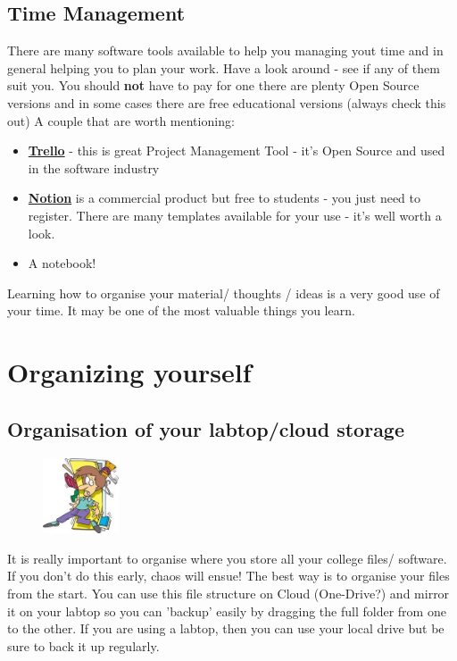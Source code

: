 \documentclass{article}
\begin{document}
 \subsection{Time Management}
 There are many software tools available to help you managing yout time and in general helping you to plan your work. Have a look around - see if any of them suit you. You should \textbf{not} have to pay for one there are plenty Open Source versions and in some cases there are free educational versions (always check this out)
 A couple that are worth mentioning: 
 \begin{itemize}
     \item \href{https://trello.com/en}{\textbf{Trello}} - this is  great Project Management Tool - it's Open Source and used in the software industry
     \item \href{https://www.notion.so/}{\textbf{Notion}} is a commercial product but free to students - you just need to register. There are many templates available for your use - it's well worth a look. 
     \item A notebook! 
 \end{itemize}
 Learning how to organise your material/ thoughts / ideas is a very good use of your time. It may be one of the most valuable things you learn. 
 
 \section{Organizing yourself}
 \subsection{Organisation of your labtop/cloud storage}

\begin{figure} %
    \centering
    \includegraphics[width=0.2\textwidth]{img/chaos.jpg}
\end{figure}

It is really important to organise where you store all your college files/ software.
If you don’t do this early, chaos will ensue! The best way is to organise your files from the start. 
You can use this file structure on Cloud (One-Drive?) and mirror it on your labtop so you can 'backup' easily by dragging the full folder from one to the other. 
If you are using a labtop, then you can use your local drive but be sure to back it up regularly.
  
\end{document}
